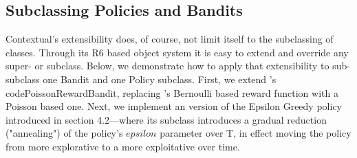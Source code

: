 \documentclass[nojss]{jss}\usepackage[]{graphicx}\usepackage[]{color}
\begin{document}
\subsection{Subclassing Policies and Bandits}

Contextual's extensibility does, of course, not limit itself to the subclassing of  classes. Through its R6 based object system it is easy to extend and override any  super- or subclass. Below, we demonstrate how to apply that extensibility to sub-subclass one Bandit and one Policy subclass.
First, we extend 's code{PoissonRewardBandit}, replacing 's Bernoulli based reward function with a Poisson based one. Next, we implement an  version of the Epsilon Greedy policy introduced in section 4.2---where its  subclass introduces a gradual reduction ("annealing") of the policy's $epsilon$ parameter over T, in effect moving the policy from more explorative to a more exploitative over time.
\end{document}
